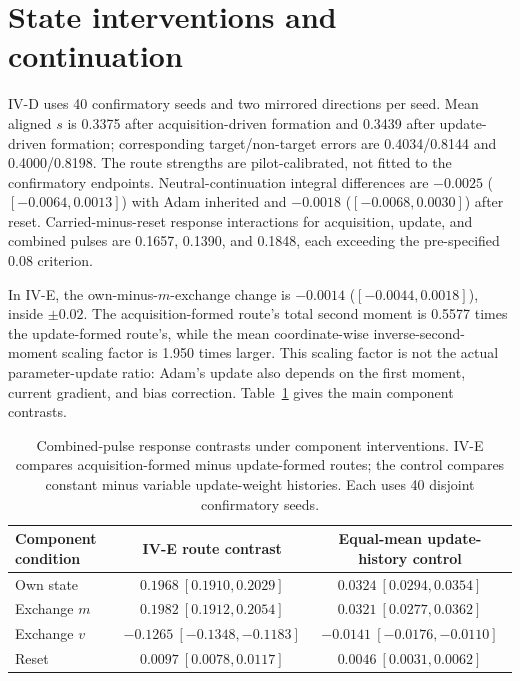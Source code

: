 \section{State interventions and continuation}
\label{app:optimizer}
IV-D uses 40 confirmatory seeds and two mirrored directions per seed. Mean aligned $s$ is 0.3375 after acquisition-driven formation and 0.3439 after update-driven formation; corresponding target/non-target errors are 0.4034/0.8144 and 0.4000/0.8198. The route strengths are pilot-calibrated, not fitted to the confirmatory endpoints. Neutral-continuation integral differences are $-0.0025$ ($[-0.0064,0.0013]$) with Adam inherited and $-0.0018$ ($[-0.0068,0.0030]$) after reset. Carried-minus-reset response interactions for acquisition, update, and combined pulses are 0.1657, 0.1390, and 0.1848, each exceeding the pre-specified 0.08 criterion.

In IV-E, the own-minus-$m$-exchange change is $-0.0014$ ($[-0.0044,0.0018]$), inside $\pm0.02$. The acquisition-formed route's total second moment is 0.5577 times the update-formed route's, while the mean coordinate-wise inverse-second-moment scaling factor is 1.950 times larger. This scaling factor is not the actual parameter-update ratio: Adam's update also depends on the first moment, current gradient, and bias correction. Table~\ref{tab:components} gives the main component contrasts.

\begin{table}[h]
\centering\small
\caption{Combined-pulse response contrasts under component interventions. IV-E compares acquisition-formed minus update-formed routes; the control compares constant minus variable update-weight histories. Each uses 40 disjoint confirmatory seeds.}
\label{tab:components}
\begin{tabular}{lcc}
\toprule
Component condition & IV-E route contrast & Equal-mean update-history control\\
\midrule
Own state & $0.1968\ [0.1910,0.2029]$ & $0.0324\ [0.0294,0.0354]$\\
Exchange $m$ & $0.1982\ [0.1912,0.2054]$ & $0.0321\ [0.0277,0.0362]$\\
Exchange $v$ & $-0.1265\ [-0.1348,-0.1183]$ & $-0.0141\ [-0.0176,-0.0110]$\\
Reset & $0.0097\ [0.0078,0.0117]$ & $0.0046\ [0.0031,0.0062]$\\
\bottomrule
\end{tabular}
\end{table}


